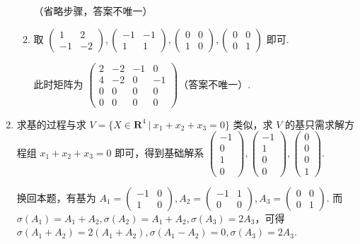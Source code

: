 \begin{enumerate}
\begin{enumerate}
        （省略步骤，答案不唯一）
        \item 取 $\begin{pmatrix}1 & 2 \\ -1 & -2\end{pmatrix},\begin{pmatrix}-1 & -1 \\ 1 & 1\end{pmatrix},\begin{pmatrix}0 & 0 \\ 1 & 0\end{pmatrix},\begin{pmatrix}0 & 0 \\ 0 & 1\end{pmatrix}$ 即可.
        
        此时矩阵为 $\begin{pmatrix}2 & -2 & -1 & 0 \\ 4 & -2 & 0 & -1 \\ 0 & 0 & 0 & 0 \\ 0 & 0 & 0 & 0\end{pmatrix}$（答案不唯一）.
    \end{enumerate}
    \item 求基的过程与求 $V=\{X\in \mathbf{R}^4\ |\ x_1+x_2+x_3=0\}$ 类似，求 $V$ 的基只需求解方程组 $x_1+x_2+x_3=0$ 即可，得到基础解系 $\begin{pmatrix}-1 \\ 0 \\ 1 \\ 0\end{pmatrix},\begin{pmatrix}-1 \\ 1 \\ 0 \\ 0\end{pmatrix},\begin{pmatrix}0 \\ 0 \\ 0 \\ 1\end{pmatrix}$.
    
    换回本题，有基为 $A_1=\begin{pmatrix}-1 & 0 \\ 1 & 0\end{pmatrix},A_2=\begin{pmatrix}-1 & 1 \\ 0 & 0\end{pmatrix},A_3=\begin{pmatrix}0 & 0 \\ 0 & 1\end{pmatrix}$.
    而 $\sigma(A_1)=A_1+A_2,\sigma(A_2)=A_1+A_2,\sigma(A_3)=2A_3$，可得 $\sigma(A_1+A_2)=2(A_1+A_2),\sigma(A_1-A_2)=0,\sigma(A_3)=2A_3$.


\end{enumerate}

